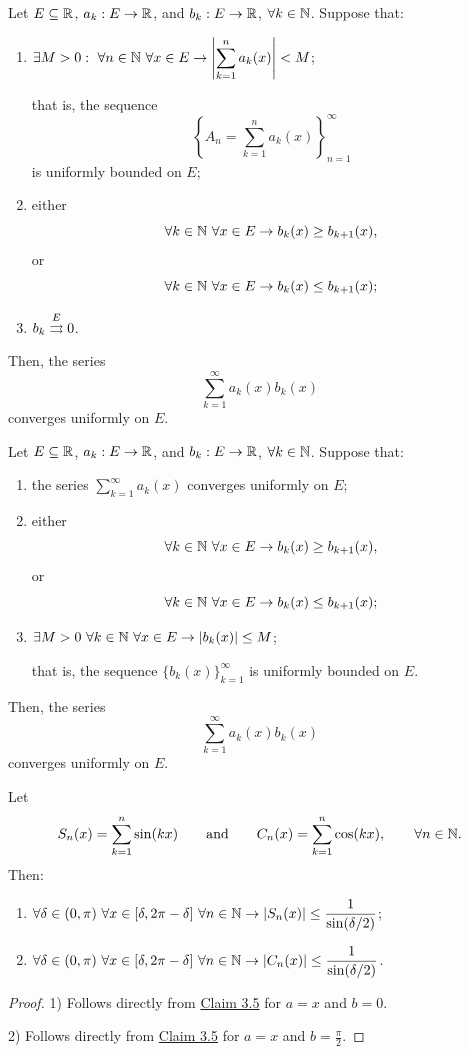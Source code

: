 \begin{claim}\label{claim:5.8}
Let $E\subseteq\mathbb{R}$, $a_k:E\to\mathbb{R}$, and $b_k:E\to\mathbb{R}$, $\forall k\in\mathbb{N}$.
Suppose that:
\begin{enumerate}[label=\alph*)]
    \item\label{item:claim:5.8:a} $\exists M>0:\ \forall n\in\mathbb{N}\ \forall x\in E\to
    \left|\displaystyle\sum_{k=1}^{n}a_k(x)\right|<M$;

    that is, the sequence
    \[
    \left\{A_n=\sum_{k=1}^{n}a_k(x)\right\}_{n=1}^{\infty}
    \]
    is uniformly bounded on $E$;

    \item\label{item:claim:5.8:b} either
    \[
    \forall k\in\mathbb{N}\ \forall x\in E\to b_k(x)\ge b_{k+1}(x),
    \]
    or
    \[
    \forall k\in\mathbb{N}\ \forall x\in E\to b_k(x)\le b_{k+1}(x);
    \]

    \item\label{item:claim:5.8:c} $b_k\mathrel{\overset{E}{\rightrightarrows}}0$.
\end{enumerate}
Then, the series
\[
\sum_{k=1}^{\infty}a_k(x)b_k(x)
\]
converges uniformly on $E$.
\end{claim}

\begin{claim}\label{claim:5.9}
Let $E\subseteq\mathbb{R}$, $a_k:E\to\mathbb{R}$, and $b_k:E\to\mathbb{R}$, $\forall k\in\mathbb{N}$.
Suppose that:
\begin{enumerate}[label=\alph*)]
    \item\label{item:claim:5.9:a} the series $\displaystyle\sum_{k=1}^{\infty}a_k(x)$ converges uniformly on $E$;

    \item\label{item:claim:5.9:b} either
    \[
    \forall k\in\mathbb{N}\ \forall x\in E\to b_k(x)\ge b_{k+1}(x),
    \]
    or
    \[
    \forall k\in\mathbb{N}\ \forall x\in E\to b_k(x)\le b_{k+1}(x);
    \]

    \item\label{item:claim:5.9:c} $\exists M>0\ \forall k\in\mathbb{N}\ \forall x\in E\to |b_k(x)|\le M$;

    that is, the sequence $\{b_k(x)\}_{k=1}^{\infty}$ is uniformly bounded on $E$.
\end{enumerate}
Then, the series
\[
\sum_{k=1}^{\infty}a_k(x)b_k(x)
\]
converges uniformly on $E$.
\end{claim}

\begin{claim}\label{claim:5.10}
Let
\[
S_n(x)=\sum_{k=1}^{n}\sin(kx)
\qquad\text{and}\qquad
C_n(x)=\sum_{k=1}^{n}\cos(kx),
\qquad \forall n\in\mathbb{N}.
\]
Then:
\begin{enumerate}
    \item\label{item:claim:5.10:1} $\forall\delta\in(0,\pi)\ \forall x\in[\delta,2\pi-\delta]\ \forall n\in\mathbb{N}\to
    \displaystyle |S_n(x)|\le\frac{1}{\sin(\delta/2)}$;
    \item\label{item:claim:5.10:2} $\forall\delta\in(0,\pi)\ \forall x\in[\delta,2\pi-\delta]\ \forall n\in\mathbb{N}\to
    \displaystyle |C_n(x)|\le\frac{1}{\sin(\delta/2)}$.
\end{enumerate}
\end{claim}

\begin{proof}
1) Follows directly from \hyperref[claim:3.5]{Claim 3.5} for $a=x$ and $b=0$.

2) Follows directly from \hyperref[claim:3.5]{Claim 3.5} for $a=x$ and $b=\frac{\pi}{2}$.
\end{proof}
